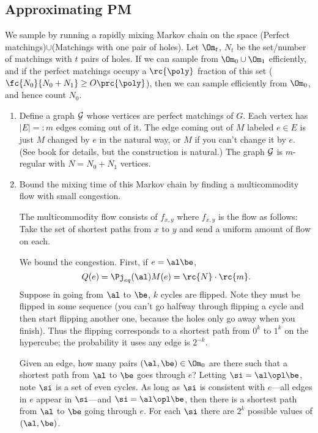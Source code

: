 \subsection{Approximating PM}
We sample by running a rapidly mixing Markov chain on the space (Perfect matchings)$\cup$(Matchings with one pair of holes). Let $\Om_t$, $N_t$ be the set/number of matchings with $t$ pairs of holes.
If we can sample from $\Om_0\cup \Om_1$ efficiently, %
and if the perfect matchings occupy a $\rc{\poly}$ fraction of this set ($\fc{N_0}{N_0+N_1}\ge O\prc{\poly}$), then we can sample efficiently from $\Om_0$, and hence count $N_0$.
\begin{enumerate}
\item
Define a graph $\cal G$ whose vertices are perfect matchings of $G$. Each vertex has $|E|=:m$ edges coming out of it. The edge coming out of $M$ labeled $e\in E$ is just $M$ changed by $e$ in the natural way, or $M$ if you can't change it by $e$. (See book for details, but the construction is natural.) The graph $\cal G$ is $m$-regular with $N=N_0+N_1$ vertices.
\item
Bound the mixing time of this Markov chain by finding a multicommodity flow with small congestion.

The multicommodity flow consists of $f_{x,y}$ where $f_{x,y}$ is the flow as follows: Take the set of shortest paths from $x$ to $y$ and send a uniform amount of flow on each.

We bound the congestion. First, if $e=\al\be$,
\[
Q(e)=\Pj_{eq}(\al)M(e) = \rc{N}\cdot \rc{m}.
\]
Suppose in going from $\al$ to $\be$, $k$ cycles are flipped. Note they must be flipped in some sequence (you can't go halfway through flipping a cycle and then start flipping another one, because the holes only go away when you finish). Thus the flipping corresponds to a shortest path from $0^k$ to $1^k$ on the hypercube; the probability it uses any edge is $2^{-k}$.

Given an edge, how many pairs $(\al,\be)\in \Om_0$ are there such that  a shortest path from $\al$ to $\be$ goes through $e$? Letting $\si=\al\opl\be$, note $\si$ is a set of even cycles. As long as $\si$ is consistent with $e$---all edges in $e$ appear in $\si$---and $\si=\al\opl \be$, then there is a shortest path from $\al$ to $\be$ going through $e$. For each $\si$ there are $2^k$ possible values of $(\al,\be)$. 


\end{enumerate}
